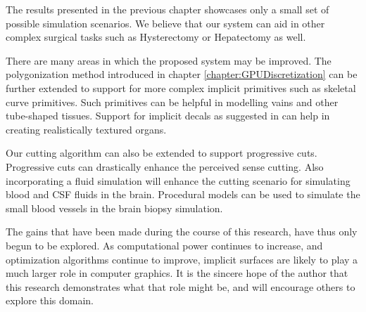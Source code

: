 The results presented in the previous chapter showcases only a small set of possible simulation scenarios. We believe that our 
system can aid in other complex surgical tasks such as Hysterectomy or Hepatectomy as well. 

There are many areas in which the proposed system may be improved. The polygonization method introduced in chapter \ref{chapter:GPUDiscretization} can be further 
extended to support for more complex implicit primitives such as skeletal curve primitives. Such primitives can be helpful in modelling vains and other tube-shaped
tissues. Support for implicit decals as suggested in \cite{Schmidtb} can help in creating realistically textured organs. 

Our cutting algorithm can also be extended to support progressive cuts. Progressive cuts can drastically enhance the perceived sense cutting. 
Also incorporating a fluid simulation will enhance the cutting scenario for simulating blood and CSF fluids in the brain.
Procedural models can be used to simulate the small blood vessels in the brain biopsy simulation. 

The gains that have been made during the course of this research, have thus only begun to be explored. As computational
power continues to increase, and optimization algorithms continue to improve, implicit surfaces are likely to play a much larger role in 
computer graphics. It is the sincere hope of the author that this research demonstrates what that role might be, and will encourage others
to explore this domain.
